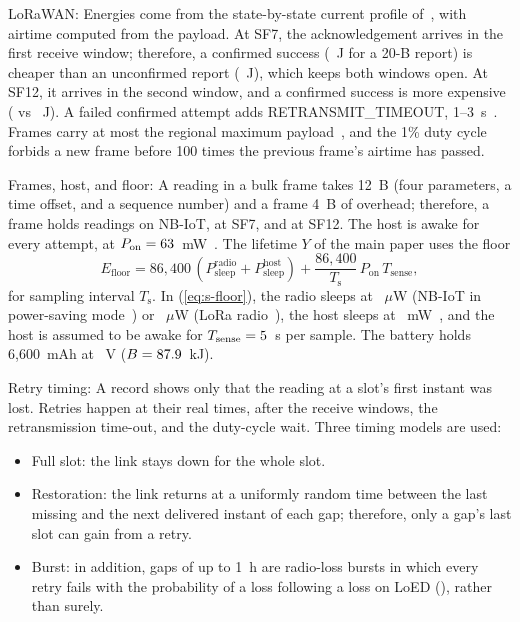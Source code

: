 \documentclass[journal]{IEEEtran}
\begin{document}
LoRaWAN: Energies come from the state-by-state current profile of~\cite{casals2017lorawan}, with airtime computed from the payload. At SF7, the acknowledgement arrives in the first receive window; therefore, a confirmed success (\eSfSevenConf~J for a 20-B report) is cheaper than an unconfirmed report (\eSfSevenUnconf~J), which keeps both windows open. At SF12, it arrives in the second window, and a confirmed success is more expensive (\eSfTwelveConf{} vs \eSfTwelveUnconf~J). A failed confirmed attempt adds RETRANSMIT\_TIMEOUT, 1--3~s~\cite{lora2021rp002}. Frames carry at most the regional maximum payload~\cite{lora2021rp002}, and the 1\% duty cycle forbids a new frame before 100 times the previous frame's airtime has passed.

Frames, host, and floor: A reading in a bulk frame takes 12~B (four parameters, a time offset, and a sequence number) and a frame 4~B of overhead; therefore, a frame holds \rpfNb{} readings on NB-IoT, \rpfSfSeven{} at SF7, and \rpfSfTwelve{} at SF12. The host is awake for every attempt, at $P_\mathrm{on}=63$~mW~\cite{libelium2020plugsense}. The lifetime $Y$ of the main paper uses the floor
\begin{equation}
E_\mathrm{floor}=86{,}400\,(P_\mathrm{sleep}^\mathrm{radio}+P_\mathrm{sleep}^\mathrm{host})+\frac{86{,}400}{T_\mathrm{s}}\,P_\mathrm{on}\,T_\mathrm{sense},\label{eq:s-floor}
\end{equation}
for sampling interval $T_\mathrm{s}$. In (\ref{eq:s-floor}), the radio sleeps at \nbPsmUW~$\mu$W (NB-IoT in power-saving mode~\cite{michelinakis2021dissecting}) or \loraSleepUW~$\mu$W (LoRa radio~\cite{casals2017lorawan}), the host sleeps at \hostSleepMW~mW~\cite{libelium2020plugsense}, and the host is assumed to be awake for $T_\mathrm{sense}=5$~s per sample. The battery holds 6{,}600~mAh at \vNode~V ($B=87.9$~kJ).

Retry timing: A record shows only that the reading at a slot's first instant was lost. Retries happen at their real times, after the receive windows, the retransmission time-out, and the duty-cycle wait. Three timing models are used:
\begin{itemize}
\item Full slot: the link stays down for the whole slot.
\item Restoration: the link returns at a uniformly random time between the last missing and the next delivered instant of each gap; therefore, only a gap's last slot can gain from a retry.
\item Burst: in addition, gaps of up to 1~h are radio-loss bursts in which every retry fails with the probability of a loss following a loss on LoED (\loedCondLoss), rather than surely.
\end{itemize}
\end{document}
